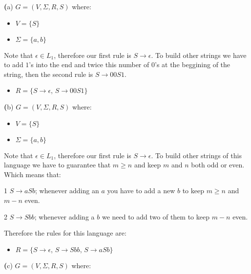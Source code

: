 \documentclass[11pt]{article}
\newcommand{\question}[2] {\vspace{0.3in}\noindent{\subsection*{Question #1. #2} \vspace{0.15in}}}
\renewcommand{\part}[1] {{\vspace{0.15in}\noindent\textbf (#1)} \vspace{0.10in}}
\begin{document}
\question{3}{}

\part{a} $G = (V, \Sigma, R, S)$ where:
\begin{itemize}
    \item{$V = \{S\}$}
    \item{$\Sigma = \{a, b\}$}
\end{itemize}
    \par Note that $\epsilon \in L_1$, therefore our first rule is $S \rightarrow \epsilon$. To build other strings we have to add $1$'s into the end and twice this number of $0$'s at the beggining of the string, then the second rule is $S \rightarrow 00S1$.
\begin{itemize}
    \item {$R = \{S \rightarrow \epsilon$, $S \rightarrow 00S1\}$}
\end{itemize}


\part{b} $G = (V, \Sigma, R, S)$ where:

\begin{itemize}
    \item{$V = \{S\}$}
    \item{$\Sigma = \{a, b\}$}
\end{itemize}

\par Note that $\epsilon \in L_1$, therefore our first rule is $S \rightarrow \epsilon$. To build other strings of this language we have to guarantee that $m \geq n$ and keep $m$ and $n$ both odd or even. Which means that:

\par 1 $S \rightarrow aSb$; whenever adding an $a$ you have to add a new $b$ to keep $m \geq n$ and $m - n$ even.
\par 2 $S \rightarrow Sbb$; whenever adding a $b$ we need to add two of them to keep $m - n$ even.
\par Therefore the rules for this language are:

\begin{itemize}    
    \item{$R = \{S \rightarrow \epsilon$, $S \rightarrow Sbb$, $S \rightarrow aSb\}$}
\end{itemize}


\part{c} $G = (V, \Sigma, R, S)$ where:
\end{document}
